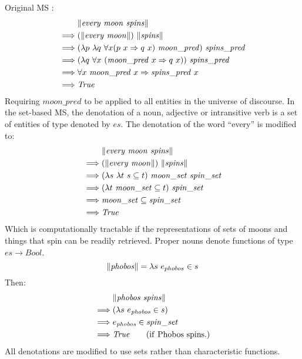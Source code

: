 \documentclass[../main.tex]{subfiles}
\begin{document}
\begin{refsection}
Original MS \cite{Dowty:wall}:
\begin{equation*}
	\begin{split}
		& \lVert \mathit{\mathit{every} \  \mathit{moon} \  \mathit{spins}} \rVert \\
		\implies&  (\lVert \mathit{\mathit{every}\ \mathit{moon}} \rVert) \  \lVert \mathit{\mathit{spins}} \rVert \\
		\implies&  (\lambda p \  \lambda q \  \forall x (p \  x \Rightarrow q \  x) \  \mathit{\mathit{moon}\_pred}) \  \mathit{\mathit{spins}\_pred} \\
		\implies&  (\lambda q \  \forall x \  (\mathit{\mathit{moon}\_pred} \   x \Rightarrow q \   x)) \  \mathit{spins\_pred} \\
		\implies&  \forall x \  \mathit{\mathit{moon}\_pred} \   x \Rightarrow \mathit{spins\_pred} \   x \\
		\implies&  \mathit{True}
	\end{split}
\end{equation*}
Requiring $\mathit{moon\_pred}$ to be applied to all entities in the universe of discourse. In the set-based MS, the denotation of a noun, adjective or intransitive verb is a set of entities of type denoted by $\mathit{es}$.
The denotation of the word ``every'' is modified to:
\begin{equation*}
	\begin{split}
		& \meaningof{\every \  \moon \  \spins} \\
		\implies&  (\meaningof{\every\ \moon}) \  \meaningof{\spins} \\
		\implies&  (\lambda s \ \lambda t \ s \subseteq t)\ \wordset{\moon} \ \wordset{\spin} \\
		\implies&  (\lambda t \ \wordset{\moon} \subseteq t)\ \wordset{\spin} \\
		\implies&  \wordset{\moon} \subseteq \wordset{\spin} \\
		\implies&  \True
	\end{split}
\end{equation*}
Which is computationally tractable if the representations of sets of moons and things that spin can be readily retrieved.
Proper nouns denote functions of type $\mathit{es} \rightarrow \mathit{Bool}$.
\[
\meaningof{\phobos} = \lambda s\ \entityassoc{phobos} \in s
\]
Then:
\begin{equation*}
	\begin{split}
		& \lVert \mathit{\mathit{phobos}\ \mathit{spins}} \rVert \\
		\implies& (\lambda s\ e_{\mathit{phobos}} \in s) \\
		\implies& e_{\mathit{phobos}} \in \mathit{spin\_set} \\
		\implies& \mathit{True} \qquad(\mathrm{if\ Phobos\ spins.})
	\end{split}
\end{equation*}
All denotations are modified to use sets rather than characteristic functions.


\end{refsection}
\end{document}
